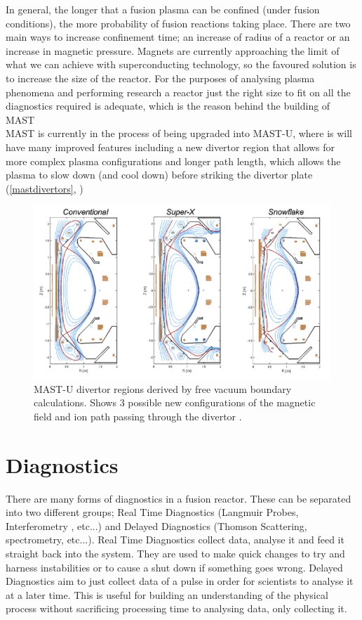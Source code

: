 \documentclass[12pt,a4paper,oneside]{report}
\begin{document}
In general, the longer that a fusion plasma can be confined (under fusion conditions), the more probability of fusion reactions taking place. There are two main ways to increase confinement time; an increase of radius of a reactor or an increase in magnetic pressure. Magnets are currently approaching the limit of what we can achieve with superconducting technology, so the favoured solution is to increase the size of the reactor. For the purposes of analysing plasma phenomena and performing research a reactor just the right size to fit on all the diagnostics required is adequate, which is the reason behind the building of MAST \cite{Chapman2015OverviewResults}\\

MAST is currently in the process of being upgraded into MAST-U, where is will have many improved features including a new divertor region that allows for more complex plasma configurations and longer path length, which allows the plasma to slow down (and cool down) before striking the divertor plate (\autoref{mastdivertors}, \cite{CulhamCenterforFusionEnergyResearch:Upgrade})

\begin{figure}[H]
\includegraphics[width=1\textwidth, center,angle=0]{Images/MASTUdivertors}
\caption{MAST-U divertor regions derived by free vacuum boundary calculations. Shows 3 possible new configurations of the magnetic field and ion path passing through the divertor \cite{CulhamCenterforFusionEnergyResearch:Upgrade}.}
\label{mastdivertors}
\end{figure}

	\section{Diagnostics}
There are many forms of diagnostics in a fusion reactor. These can be separated into two different groups; Real Time Diagnostics (Langmuir Probes, Interferometry \cite{Brunner2017}, etc...) and Delayed Diagnostics (Thomson Scattering\cite{Scannell2008DesignMAST}, spectrometry, etc...). Real Time Diagnostics collect data, analyse it and feed it straight back into the system. They are used to make quick changes to try and harness instabilities or to cause a shut down if something goes wrong. Delayed Diagnostics aim to just collect data of a pulse in order for scientists to analyse it at a later time. This is useful for building an understanding of the physical process without sacrificing processing time to analysing data, only collecting it. 
\medskip
\end{document}
